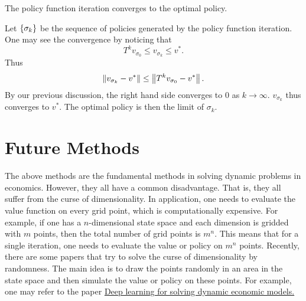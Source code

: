 \documentclass[12pt]{article}
\begin{document}
\begin{corollary}
    The policy function iteration converges to the optimal policy.
\end{corollary}
\begin{pf}
    Let $\left\{ {\sigma_k} \right\}$ be the sequence of policies generated by 
    the policy function iteration. One may see the convergence by 
    noticing that 
    \begin{equation}
        T^k v_{\sigma_0} \leq v_{\sigma_k} \leq v^*.
    \end{equation}
    Thus 
    \begin{equation}
        \left\lVert {v_{\sigma_k} - v^*} \right\rVert \leq \left\lVert {T^k v_{\sigma_0} - v^*} \right\rVert.
    \end{equation}
    By our previous discussion, the right hand side converges to 
    $0$ as $k\to\infty$. $v_{\sigma_k}$ thus converges to $v^*$. 
    The optimal policy is then the limit of $\sigma_k$.
\end{pf}

\section{Future Methods}
The above methods are the fundamental methods in solving dynamic 
problems in economics. However, they all have a common disadvantage. 
That is, they all suffer from the curse of dimensionality. In 
application, one needs to evaluate the value function on every 
grid point, which is computationally expensive. For example, 
if one has a $n$-dimensional state space and each dimension is 
gridded with $m$ points, then the total number of grid points 
is $m^n$. This means that for a single iteration, one needs to 
evaluate the value or policy on $m^n$ points. Recently, there are 
some papers that try to solve the curse of dimensionality by 
randomness. The main idea is to draw the points randomly in an 
area in the state space and then simulate the value or policy 
on these points. For example, one may refer to the paper 
\href{https://www.sciencedirect.com/science/article/pii/S0304393221000799}
{Deep learning for solving dynamic economic models.}
\end{document}
